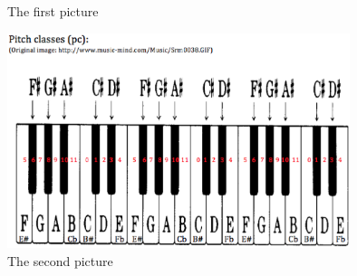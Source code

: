 \begin{figure}
\begin{center}
\end{center}

\caption{The first picture\label{m42}}
\end{figure}


\begin{figure} %
  \centering
  \includegraphics[width=10cm]{figures/serialismPianoImage}
  \caption{The second picture}
  \label{fig:xfig1}
\end{figure}


